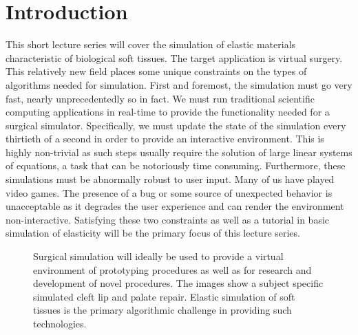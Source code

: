 \documentclass[article]{pcms-l}
\begin{document}
\section*{Introduction}
This short lecture series will cover the simulation of elastic materials characteristic of biological soft tissues. The target application is virtual surgery. This relatively new field places some unique constraints on the types of algorithms needed for simulation. First and foremost, the simulation must go very fast, nearly unprecedentedly so in fact. We must run traditional scientific computing applications in real-time to provide the functionality needed for a surgical simulator. Specifically, we must update the state of the simulation every thirtieth of a second in order to provide an interactive environment. This is highly non-trivial as such steps usually require the solution of large linear systems of equations, a task that can be notoriously time consuming. Furthermore, these simulations must be abnormally robust to user input. Many of us have played video games. The presence of a bug or some source of unexpected behavior is unacceptable as it degrades the user experience and can render the environment non-interactive. Satisfying these two constraints as well as a tutorial in basic simulation of elasticity will be the primary focus of this lecture series.

\begin{figure}
\caption{Surgical simulation will ideally be used to provide a virtual environment of prototyping procedures as well as for research and development of novel procedures. The images show a subject specific simulated cleft lip and palate repair. Elastic simulation of soft tissues is the primary algorithmic challenge in providing such technologies.}
\label{cleft}
\end{figure}
\end{document}
